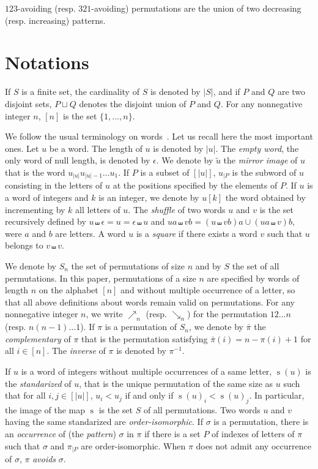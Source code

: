 \documentclass[a4paper]{llncs}
\DeclareMathOperator{\STD}{\mathrm{s}}
\begin{document}
$123$-avoiding (resp. $321$-avoiding) permutations are the union of two decreasing
(resp. increasing) patterns.


\section{Notations}
\label{section:Notations}

If $S$ is a finite set, the cardinality of $S$ is denoted by $|S|$,
and if $P$ and $Q$ are two disjoint sets, $P \sqcup Q$ denotes the
disjoint union of $P$ and $Q$. For any nonnegative integer $n$, $[n]$
is the set $\{1, \dots, n\}$.

We follow the usual terminology on words~\cite{ChoffrutKarhumaki1997}.
Let us recall here the most important ones. Let $u$ be a word. The
length of $u$ is denoted by $|u|$. The {\em empty word}, the only word
of null length, is denoted by $\epsilon$. We denote by $\widetilde{u}$
the {\em mirror image} of $u$ that is the word
$u_{|u|} u_{|u| - 1} \dots u_1$. If $P$ is a subset of $[|u|]$, $u_{|P}$
is the subword of $u$ consisting in the letters of $u$ at the positions
specified by the elements of $P$.
If $u$ is a word of integers and $k$ is an integer, we denote by
$u[k]$ the word obtained by incrementing by $k$ all letters of $u$.
The {\em shuffle} of two words $u$ and
$v$ is the set recursively defined by
$u \shuffle \epsilon = u = \epsilon \shuffle u$ and
$ua \shuffle vb = (u \shuffle vb)a \cup (ua \shuffle v)b$, were $a$ and
$b$ are letters. A word $u$ is a {\em square} if there exists a word $v$
such that $u$ belongs to $v \shuffle v$.

We denote by $S_n$ the set of permutations of size $n$ and by $S$ the
set of all permutations. In this paper, permutations of a size $n$
are specified by words of length $n$ on the alphabet $[n]$ and without
multiple occurrence of a letter, so that all above definitions about
words remain valid on permutations.
For any nonnegative integer $n$, we write $\nearrow_{n}$
(resp. $\searrow_{n}$)
for the permutation $1 2 \ldots n$ (resp. $n (n-1) \ldots 1$).
If $\pi$ is a permutation of $S_n$,
we denote by $\bar \pi$ the {\em complementary} of $\pi$ that is the
permutation satisfying $\bar \pi(i) = n - \pi(i) + 1$ for all
$i \in [n]$. The {\em inverse} of $\pi$ is denoted by $\pi^{-1}$.

If $u$ is a word of integers without multiple
occurrences of a same letter, $\STD(u)$ is the {\em standarized} of $u$,
that is the unique permutation of the same size as $u$ such that for all
$i, j \in [|u|]$, $u_i < u_j$ if and only if $\STD(u)_i < \STD(u)_j$. In
particular, the image of the map $\STD$ is the set $S$ of all
permutations. Two words $u$ and $v$ having the same standarized are
{\em order-isomorphic}. If $\sigma$ is a permutation, there is an
{\em occurrence} of (the {\em pattern}) $\sigma$ in $\pi$ if there is a
set $P$ of indexes of letters of $\pi$ such that $\sigma$ and $\pi_{|P}$
are order-isomorphic. When $\pi$ does not admit any occurrence of
$\sigma$, $\pi$ {\em avoids} $\sigma$.
\end{document}
